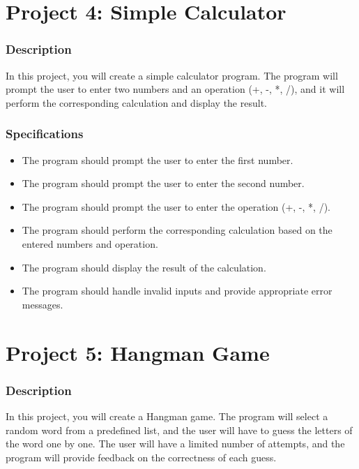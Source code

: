\documentclass[12pt]{book}
\begin{document}
\newpage

\section{Project 4: Simple Calculator}

\subsubsection{Description}
In this project, you will create a simple calculator program. The program will prompt the user to enter two numbers and an operation (+, -, *, /), and it will perform the corresponding calculation and display the result.

\subsubsection{Specifications}
\begin{itemize}
\item The program should prompt the user to enter the first number.
\item The program should prompt the user to enter the second number.
\item The program should prompt the user to enter the operation (+, -, *, /).
\item The program should perform the corresponding calculation based on the entered numbers and operation.
\item The program should display the result of the calculation.
\item The program should handle invalid inputs and provide appropriate error messages.
\end{itemize}

\newpage


\section{Project 5: Hangman Game}

\subsubsection{Description}
In this project, you will create a Hangman game. The program will select a random word from a predefined list, and the user will have to guess the letters of the word one by one. The user will have a limited number of attempts, and the program will provide feedback on the correctness of each guess.
\end{document}
